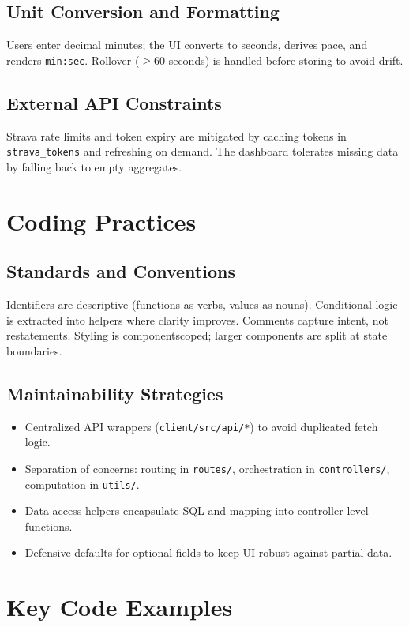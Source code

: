 \subsection{Unit Conversion and Formatting}
Users enter decimal minutes; the UI converts to seconds, derives pace, and renders \verb|min:sec|. Rollover (\(\geq 60\) seconds) is handled before storing to avoid drift.

\subsection{External API Constraints}
Strava rate limits and token expiry are mitigated by caching tokens in \verb|strava_tokens| and refreshing on demand. The dashboard tolerates missing data by falling back to empty aggregates.

\section{Coding Practices}
\subsection{Standards and Conventions}
Identifiers are descriptive (functions as verbs, values as nouns). Conditional logic is extracted into helpers where clarity improves. Comments capture intent, not restatements. Styling is component\-scoped; larger components are split at state boundaries.

\subsection{Maintainability Strategies}
\begin{itemize}
  \item Centralized API wrappers (\verb|client/src/api/*|) to avoid duplicated fetch logic.
  \item Separation of concerns: routing in \verb|routes/|, orchestration in \verb|controllers/|, computation in \verb|utils/|.
  \item Data access helpers encapsulate SQL and mapping into controller-level functions.
  \item Defensive defaults for optional fields to keep UI robust against partial data.
\end{itemize}

\section{Key Code Examples}
